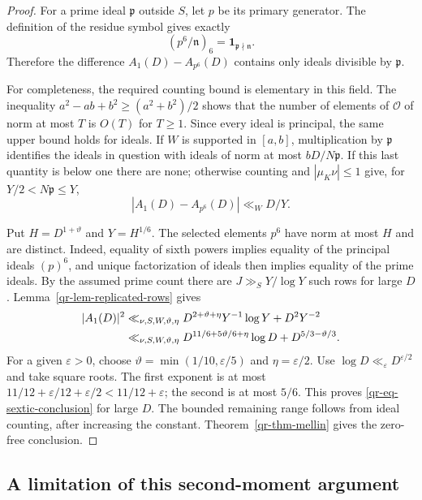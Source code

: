 \begin{proof}
For a prime ideal $\mathfrak p$ outside $S$, let $p$ be its primary
generator. The definition of the residue symbol gives exactly
\[
 (p^6/\mathfrak n)_6=\mathbf1_{\mathfrak p\nmid\mathfrak n}.
\]
Therefore the difference $A_1(D)-A_{p^6}(D)$ contains only ideals
divisible by $\mathfrak p$.

For completeness, the required counting bound is elementary in this
field. The inequality
$a^2-ab+b^2\geq(a^2+b^2)/2$ shows that the number of elements of
$\mathcal O$ of norm at most $T$ is $O(T)$ for $T\geq1$. Since every
ideal is principal, the same upper bound holds for ideals. If $W$ is
supported in $[a,b]$, multiplication by $\mathfrak p$ identifies the
ideals in question with ideals of norm at most $bD/N\mathfrak p$.
If this last quantity is below one there are none; otherwise counting
and $|\mu_K\nu|\leq1$ give, for $Y/2<N\mathfrak p\leq Y$,
\begin{equation}\label{qr-eq-sextic-error}
 |A_1(D)-A_{p^6}(D)|\ll_W D/Y.
\end{equation}

Put $H=D^{1+\vartheta}$ and $Y=H^{1/6}$. The selected elements
$p^6$ have norm at most $H$ and are distinct. Indeed, equality of
sixth powers implies equality of the principal ideals $(p)^6$,
and unique factorization of ideals then implies equality of the
prime ideals. By the assumed prime count there are
$J\gg_S Y/\log Y$ such rows for large $D$.
Lemma~\ref{qr-lem-replicated-rows} gives
\begin{align}
 |A_1(D)|^2
 &\ll_{\nu,S,W,\vartheta,\eta}
 D^{2+\vartheta+\eta}Y^{-1}\log Y+D^2Y^{-2}\notag\\
 &\ll_{\nu,S,W,\vartheta,\eta}
 D^{11/6+5\vartheta/6+\eta}\log D
       +D^{5/3-\vartheta/3}.
 \label{qr-eq-sextic-squared}
\end{align}
For a given $\varepsilon>0$, choose
$\vartheta=\min(1/10,\varepsilon/5)$ and $\eta=\varepsilon/2$.
Use $\log D\ll_\varepsilon D^{\varepsilon/2}$ and take square roots.
The first exponent is at most
$11/12+\varepsilon/12+\varepsilon/2<11/12+\varepsilon$;
the second is at most $5/6$. This proves
\eqref{qr-eq-sextic-conclusion} for large $D$. The bounded remaining
range follows from ideal counting, after increasing the constant.
Theorem~\ref{qr-thm-mellin} gives the zero-free conclusion.
\end{proof}

\subsection{A limitation of this second-moment argument}
\label{qr-subsec-exponent-limit}

